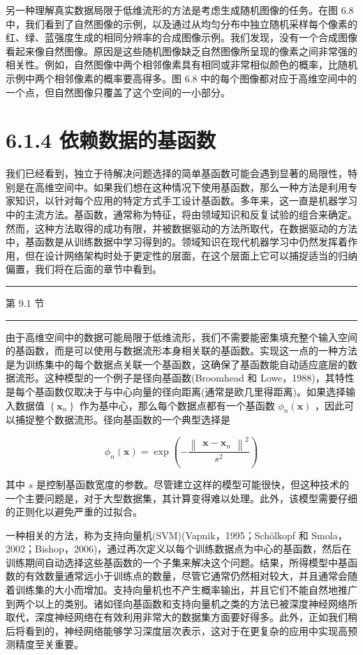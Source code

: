 \documentclass[10pt]{report}
\newcommand{\HRule}{\begin{center}\rule{0.9\linewidth}{0.2mm}\end{center}}
\begin{document}
另一种理解真实数据局限于低维流形的方法是考虑生成随机图像的任务。在图 6.8 中，我们看到了自然图像的示例，以及通过从均匀分布中独立随机采样每个像素的红、绿、蓝强度生成的相同分辨率的合成图像示例。我们发现，没有一个合成图像看起来像自然图像。原因是这些随机图像缺乏自然图像所呈现的像素之间非常强的相关性。例如，自然图像中两个相邻像素具有相同或非常相似颜色的概率，比随机示例中两个相邻像素的概率要高得多。图 6.8 中的每个图像都对应于高维空间中的一个点，但自然图像只覆盖了这个空间的一小部分。

\section*{6.1.4 依赖数据的基函数}

我们已经看到，独立于待解决问题选择的简单基函数可能会遇到显著的局限性，特别是在高维空间中。如果我们想在这种情况下使用基函数，那么一种方法是利用专家知识，以针对每个应用的特定方式手工设计基函数。多年来，这一直是机器学习中的主流方法。基函数，通常称为特征，将由领域知识和反复试验的组合来确定。然而，这种方法取得的成功有限，并被数据驱动的方法所取代，在数据驱动的方法中，基函数是从训练数据中学习得到的。领域知识在现代机器学习中仍然发挥着作用，但在设计网络架构时处于更定性的层面，在这个层面上它可以捕捉适当的归纳偏置，我们将在后面的章节中看到。

\HRule

第 9.1 节

\HRule

由于高维空间中的数据可能局限于低维流形，我们不需要能密集填充整个输入空间的基函数，而是可以使用与数据流形本身相关联的基函数。实现这一点的一种方法是为训练集中的每个数据点关联一个基函数，这确保了基函数能自动适应底层的数据流形。这种模型的一个例子是径向基函数(Broomhead 和 Lowe，1988)，其特性是每个基函数仅取决于与中心向量的径向距离(通常是欧几里得距离)。如果选择输入数据值 \(\left\{  {\mathbf{x}}_{n}\right\}\) 作为基中心，那么每个数据点都有一个基函数 \({\phi }_{n}\left( \mathbf{x}\right)\) ，因此可以捕捉整个数据流形。径向基函数的一个典型选择是

\[
{\phi }_{n}\left( \mathbf{x}\right)  = \exp \left( {-\frac{{\begin{Vmatrix}\mathbf{x} - {\mathbf{x}}_{n}\end{Vmatrix}}^{2}}{{s}^{2}}}\right)  \tag{6.6}
\]

其中 \(s\) 是控制基函数宽度的参数。尽管建立这样的模型可能很快，但这种技术的一个主要问题是，对于大型数据集，其计算变得难以处理。此外，该模型需要仔细的正则化以避免严重的过拟合。

一种相关的方法，称为支持向量机(SVM)(Vapnik，1995；Schölkopf 和 Smola，2002；Bishop，2006)，通过再次定义以每个训练数据点为中心的基函数，然后在训练期间自动选择这些基函数的一个子集来解决这个问题。结果，所得模型中基函数的有效数量通常远小于训练点的数量，尽管它通常仍然相对较大，并且通常会随着训练集的大小而增加。支持向量机也不产生概率输出，并且它们不能自然地推广到两个以上的类别。诸如径向基函数和支持向量机之类的方法已被深度神经网络所取代，深度神经网络在有效利用非常大的数据集方面要好得多。此外，正如我们稍后将看到的，神经网络能够学习深度层次表示，这对于在更复杂的应用中实现高预测精度至关重要。
\end{document}
